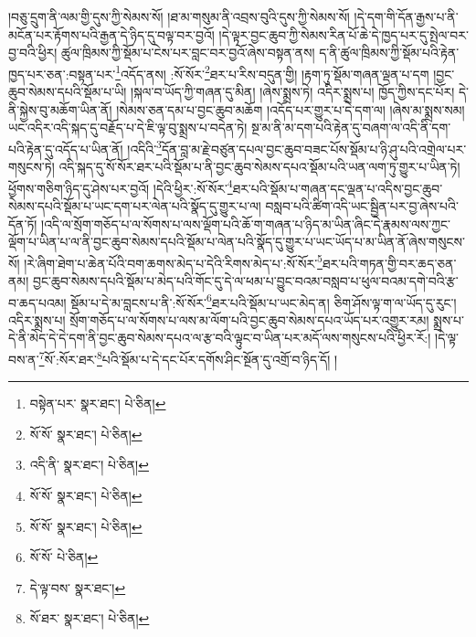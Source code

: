 །བཅུ་དྲུག་ནི་ལམ་གྱི་དུས་ཀྱི་སེམས་སོ། །ཐ་མ་གསུམ་ནི་འབྲས་བུའི་དུས་ཀྱི་སེམས་སོ། །དེ་དག་གི་དོན་རྒྱས་པ་ནི་མངོན་པར་རྟོགས་པའི་རྒྱན་དེ་ཉིད་དུ་བལྟ་བར་བྱའོ། །དེ་ལྟར་བྱང་ཆུབ་ཀྱི་སེམས་རིན་པོ་ཆེ་དེ་ཁྱད་པར་དུ་སྤེལ་བར་བྱ་བའི་ཕྱིར། ཚུལ་ཁྲིམས་ཀྱི་སྡོམ་པ་ངེས་པར་བླང་བར་བྱའོ་ཞེས་བསྟན་ནས། ད་ནི་ཚུལ་ཁྲིམས་ཀྱི་སྡོམ་པའི་རྟེན་ཁྱད་པར་ཅན་:བསྟན་པར་\footnote{བསྟེན་པར་  སྣར་ཐང་།  པེ་ཅིན། }འདོད་ནས། :སོ་སོར་\footnote{སོ་སོ་  སྣར་ཐང་།  པེ་ཅིན། }ཐར་པ་རིས་བདུན་གྱི། །རྟག་ཏུ་སྡོམ་གཞན་ལྡན་པ་དག །བྱང་ཆུབ་སེམས་དཔའི་སྡོམ་པ་ཡི། །སྐལ་བ་ཡོད་ཀྱི་གཞན་དུ་མིན། །ཞེས་སྨྲས་ཏེ། འདིར་སྨྲས་པ། ཁྱོད་ཀྱིས་དང་པོར། དེ་ནི་སྐྱེས་བུ་མཆོག་ཡིན་ནོ། །སེམས་ཅན་དམ་པ་བྱང་ཆུབ་མཆོག །འདོད་པར་གྱུར་པ་དེ་དག་ལ། །ཞེས་མ་སྨྲས་སམ། ཡང་འདིར་འདི་སྐད་དུ་བརྗོད་པ་དེ་ཇི་ལྟ་བུ་སྨྲས་པ་བདེན་ཏེ། སྔ་མ་ནི་མ་དག་པའི་རྟེན་དུ་བཞག་ལ་འདི་ནི་དག་པའི་རྟེན་དུ་འདོད་པ་ཡིན་ནོ། །འདིའི་\footnote{འདི་ནི་  སྣར་ཐང་།  པེ་ཅིན། }དོན་བླ་མ་རྗེ་བཙུན་དཔལ་བྱང་ཆུབ་བཟང་པོས་སྡོམ་པ་ཉི་ཤུ་པའི་འགྲེལ་པར་གསུངས་ཏེ། འདི་སྐད་དུ་སོ་སོར་ཐར་པའི་སྡོམ་པ་ནི་བྱང་ཆུབ་སེམས་དཔའ་སྡོམ་པའི་ཡན་ལག་ཏུ་གྱུར་པ་ཡིན་ཏེ། ཕྱོགས་གཅིག་ཉིད་དུ་ཤེས་པར་བྱའོ། །དེའི་ཕྱིར་:སོ་སོར་\footnote{སོ་སོ་  སྣར་ཐང་།  པེ་ཅིན། }ཐར་པའི་སྡོམ་པ་གཞན་དང་ལྡན་པ་འདིས་བྱང་ཆུབ་སེམས་དཔའི་སྡོམ་པ་ཡང་དག་པར་ལེན་པའི་སྣོད་དུ་གྱུར་པ་ལ། བསླབ་པའི་ཚིག་འདི་ཡང་སྦྱིན་པར་བྱ་ཞེས་པའི་དོན་ཏོ། །འདི་ལ་སྲོག་གཅོད་པ་ལ་སོགས་པ་ལས་ལྡོག་པའི་ཆོ་ག་གཞན་པ་ཉིད་མ་ཡིན་ཞིང་དེ་རྣམས་ལས་ཀྱང་ལྡོག་པ་ཡིན་པ་ལ་ནི་བྱང་ཆུབ་སེམས་དཔའི་སྡོམ་པ་ལེན་པའི་སྣོད་དུ་གྱུར་པ་ཡང་ཡོད་པ་མ་ཡིན་ནོ་ཞེས་གསུངས་སོ། །རེ་ཞིག་ཐེག་པ་ཆེན་པོའི་བག་ཆགས་མེད་པ་དེའི་རིགས་མེད་པ་:སོ་སོར་\footnote{སོ་སོ་  སྣར་ཐང་།  པེ་ཅིན། }ཐར་པའི་གཏན་གྱི་བར་ཆད་ཅན་ནམ། བྱང་ཆུབ་སེམས་དཔའི་སྡོམ་པ་མེད་པའི་གོང་དུ་དེ་ལ་ཕམ་པ་བྱུང་བའམ་བསླབ་པ་ཕུལ་བའམ་དགེ་བའི་རྩ་བ་ཆད་པའམ། སྡོམ་པ་དེ་མ་བླངས་པ་ནི་:སོ་སོར་\footnote{སོ་སོ་  པེ་ཅིན། }ཐར་པའི་སྡོམ་པ་ཡང་མེད་ན། ཅིག་ཤོས་ལྟ་ག་ལ་ཡོད་དུ་རུང་། འདིར་སྨྲས་པ། སྲོག་གཅོད་པ་ལ་སོགས་པ་ལས་མ་ལོག་པའི་བྱང་ཆུབ་སེམས་དཔའ་ཡོད་པར་འགྱུར་རམ། སྨྲས་པ་དེ་ནི་མེད་དེ་དེ་དག་ནི་བྱང་ཆུབ་སེམས་དཔའ་ལ་རྩ་བའི་ལྟུང་བ་ཡིན་པར་མདོ་ལས་གསུངས་པའི་ཕྱིར་རོ:། །དེ་ལྟ་བས་ན་\footnote{དེ་ལྟ་བས་  སྣར་ཐང་། }སོ་:སོར་ཐར་\footnote{སོ་ཐར་  སྣར་ཐང་།  པེ་ཅིན། }པའི་སྡོམ་པ་དེ་དང་པོར་དགོས་ཤིང་སྔོན་དུ་འགྲོ་བ་ཉིད་དོ། །
